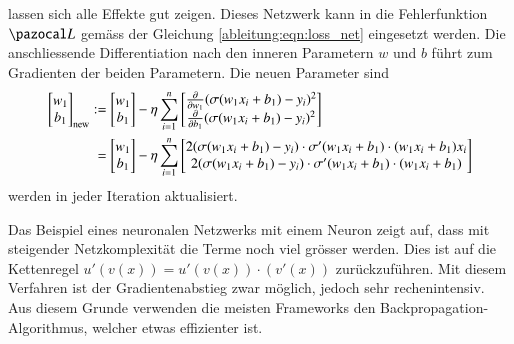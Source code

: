lassen sich alle Effekte gut zeigen.
Dieses Netzwerk kann in die Fehlerfunktion $\Lb$ gemäss der Gleichung
\eqref{ableitung:eqn:loss_net} eingesetzt werden.
Die anschliessende Differentiation nach den inneren Parametern $w$
und $b$ führt zum Gradienten der beiden Parametern.
Die neuen Parameter sind
\begin{align}
\begin{bmatrix}w_{1}\\b_{1}\end{bmatrix}_{\text{new}}
&:=
{\begin{bmatrix}w_{1}\\b_{1}\end{bmatrix}}
-\eta
\sum_{i=1}^n
{\begin{bmatrix}
{\frac {\partial }{\partial w_{1}}}(\sigma(w_{1}x_{i}+b_{1})-y_{i})^{2}\\
{\frac {\partial }{\partial b_{1}}}(\sigma(w_{1}x_{i}+b_{1})-y_{i})^{2}\end{bmatrix}}
\notag
\\
&\phantom{:}=
{\begin{bmatrix}w_{1}\\b_{1}\end{bmatrix}}
-
\eta
\sum_{i=1}^n
{\begin{bmatrix}2(\sigma(w_{1}x_{i}+b_{1}) - y_i) \cdot \sigma'(w_{1}x_{i}+b_{1}) \cdot (w_{1}x_{i}+b_{1}) x_{i} \\2(\sigma(w_{1}x_{i}+b_{1}) - y_i) \cdot \sigma'(w_{1}x_{i}+b_{1}) \cdot (w_{1}x_{i}+b_{1}) \end{bmatrix}}
\end{align}
werden in jeder Iteration aktualisiert.

Das Beispiel eines neuronalen Netzwerks mit einem Neuron zeigt auf,
dass mit steigender Netzkomplexität die Terme noch viel grösser werden.
Dies ist auf die Kettenregel $u'(v(x)) = u'(v(x)) \cdot (v'(x))$ zurückzuführen.
Mit diesem Verfahren ist der Gradientenabstieg zwar möglich, jedoch sehr rechenintensiv.
Aus diesem Grunde verwenden die meisten Frameworks den Backpropagation-Algorithmus, welcher etwas effizienter ist.
